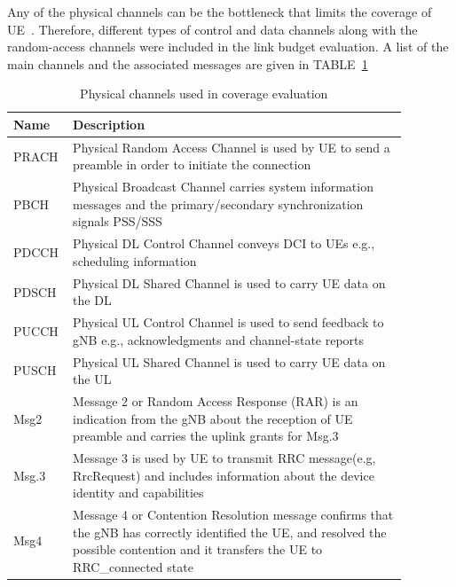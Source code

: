 \documentclass[]{IEEEtran}
\begin{document}
Any of the physical channels can be the bottleneck that limits the coverage of UE~\cite{moloudi_coverage_2021}.
Therefore, different types of control and data channels along with the random-access channels were included in the link budget evaluation.
A list of the main channels and the associated messages are given in TABLE~\ref{table:coverage-evaluation-physical-channels}~\cite{3gpp_study_2021_38.875}
\begin{table}
\centering
\caption{Physical channels used in coverage evaluation}
\begin{tabular}{| m{0.08\linewidth}  m{0.8\linewidth}|} 
 \hline
    \textbf{Name}  &  \textbf{Description} \\
\hline
    PRACH & Physical Random Access Channel is used by UE to send a preamble in order to initiate the connection\\
\hline
    PBCH & Physical Broadcast Channel carries system information messages and the primary/secondary synchronization signals PSS/SSS\\
\hline
    PDCCH & Physical DL Control Channel conveys DCI to UEs e.g., scheduling information \\
\hline
    PDSCH &  Physical DL Shared Channel is used to carry UE data on the DL\\
\hline
    PUCCH &  Physical UL Control Channel is used to send feedback to gNB e.g., acknowledgments and channel-state reports\\
\hline
    PUSCH &  Physical UL Shared Channel is used to carry UE data on the UL\\
\hline
    Msg2 &  Message 2 or Random Access Response (RAR) is an indication from the gNB about the reception of UE preamble and carries the uplink grants for Msg.3\\
\hline
    Msg.3 &  Message 3 is used by UE to transmit RRC message(e.g, RrcRequest) and includes information about the device identity and capabilities\\ 
\hline
    Msg4 &  Message 4 or Contention Resolution message confirms that the gNB has correctly identified the UE, and resolved the possible contention and it transfers the UE to RRC\_connected state\\
\hline
\end{tabular}
\label{table:coverage-evaluation-physical-channels}
\end{table}
\end{document}
